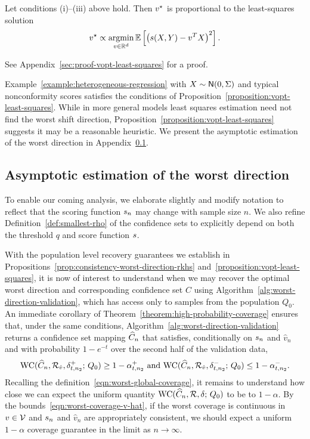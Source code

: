 \begin{proposition}
  \label{proposition:vopt-least-squares}
  Let conditions (i)--(iii) above hold. Then $v^\star$ is proportional to the
  least-squares solution
  \begin{align}
    \label{eqn:vopt-least-sq}
    v^\star \propto \mathop{\rm argmin}_{v \in \mathbb{R}^d}
    \mathbb{E}\left[ \left( s(X,Y) - v^T X  \right)^2 \right].
  \end{align} 
\end{proposition}
\noindent
See
Appendix~\ref{sec:proof-vopt-least-squares} for a proof.

Example~\ref{example:heterogeneous-regression} with $X \sim
\mathsf{N}(0,\Sigma)$
and typical nonconformity scores
satisfies the conditions of
Proposition~\ref{proposition:vopt-least-squares}.  While in more general
models least squares estimation need not find the worst shift
direction, Proposition~\ref{proposition:vopt-least-squares} suggests
it may be a reasonable heuristic. We present the asymptotic estimation of the worst direction in Appendix~\ref{sec:asymptotic_est_worst_direction}.




\subsection{Asymptotic estimation of the worst direction}
\label{sec:asymptotic_est_worst_direction}

To enable our coming
analysis, we elaborate slightly and modify notation to reflect that the
scoring function $s_n$ may change with sample size $n$.  We also refine
Definition~\ref{def:smallest-rho} of the confidence sets to explicitly
depend on both the threshold $q$ and score function $s$.

With the population level recovery guarantees we establish in
Propositions~\ref{prop:consistency-worst-direction-rkhs} and~\ref{proposition:vopt-least-squares}, it
is now of interest to understand when we may recover the optimal worst
direction and corresponding confidence set $C$ using
Algorithm~\ref{alg:worst-direction-validation}, which has access only to samples from the population $Q_0$.  An immediate corollary of
Theorem~\ref{theorem:high-probability-coverage} ensures that, under
the same conditions,
Algorithm~\ref{alg:worst-direction-validation}
returns a confidence set mapping $\widehat{C}_n$ that satisfies, conditionally
on $s_n$ and $\hat{v}_n$ and with probability $1-e^{-t}$ over the second
half of the validation data,
\begin{align}
  \label{eqn:worst-coverage-v-hat}
  \textup{WC}( \widehat{C}_n, \mathcal{R}_{\hat{v}}, \delta_{t,n_2}^+; \, Q_0)
  \ge 1 - \alpha_{t,n_2}^+ ~ \text{and} ~
  \textup{WC}( \widehat{C}_n, \mathcal{R}_{\hat{v}}, \delta_{t,n_2}^-; \, Q_0)
  \le 1 - \alpha_{t,n_2}^-.
\end{align}
Recalling the definition~\eqref{eqn:worst-global-coverage}, it remains to
understand how close we can expect the uniform quantity $\textup{WC}( \widehat{C}_n,
\mathcal{R},\delta; \, Q_0)$ to be to $1-\alpha$.  By the
bounds~\eqref{eqn:worst-coverage-v-hat}, if the worst coverage is continuous
in $v \in \mathcal{V}$ and $s_n$ and $\hat{v}_n$ are appropriately
consistent, we should expect a uniform $1-\alpha$ coverage guarantee in the
limit as $n \to \infty$.

